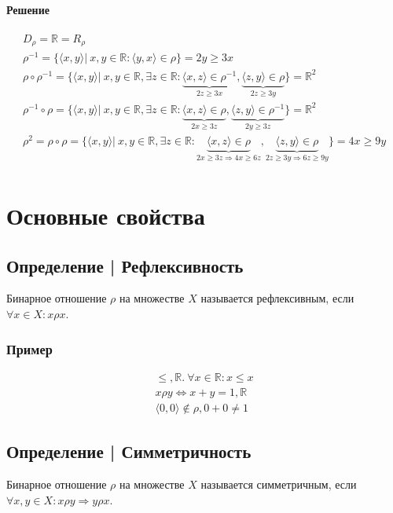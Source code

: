 \documentclass{article}
\begin{document}
\paragraph{Решение}
\begin{gather*}
    D_{\rho} = \mathbb{R} = R_{\rho} \\
    \rho^{-1} = \{\langle x, y \rangle |~x, y \in \mathbb{R}: \langle y, x \rangle \in \rho\} = 2y \ge 3x \\
    \rho \circ \rho^{-1} = 
    \{\langle x, y \rangle |~x, y \in \mathbb{R}, \exists z \in \mathbb{R}: \underbrace{\langle x, z \rangle \in \rho^{-1}}_{2z \ge 3x}, \underbrace{\langle z, y \rangle \in \rho}_{2z \ge 3y}\} = \mathbb{R}^2 \\
    \rho^{-1} \circ \rho = \{\langle x, y \rangle |~x, y \in \mathbb{R}, \exists z \in \mathbb{R}: \underbrace{\langle x, z \rangle \in \rho}_{2x \ge 3z}, \underbrace{\langle z, y \rangle \in \rho^{-1}}_{2y \ge 3z}\} = \mathbb{R}^2 \\
    \rho^2 = \rho \circ \rho = \{\langle x, y \rangle |~x, y \in \mathbb{R}, \exists z \in \mathbb{R}: \underbrace{\langle x, z \rangle \in \rho}_{2x \ge 3z \Rightarrow 4x \ge 6z}, \underbrace{\langle z, y \rangle \in \rho}_{2z \ge 3y \Rightarrow 6z \ge 9y}\} = 4x \ge 9y \\
\end{gather*}


\section{Основные свойства}

\subsection{Определение | Рефлексивность}
Бинарное отношение $\rho$ на множестве $X$ называется рефлексивным, если $\forall x \in X: x \rho x$.

\subsubsection{Пример}
\begin{gather*}
    \le, \mathbb{R}. ~ \forall x \in \mathbb{R}: x \le x \\
    x \rho y \Leftrightarrow x + y = 1, \mathbb{R} \\
    \langle 0, 0 \rangle \notin \rho, 0+0 \neq 1
\end{gather*}


\subsection{Определение | Симметричность}
Бинарное отношение $\rho$ на множестве $X$ называется симметричным, если $\forall x, y \in X: x \rho y \Rightarrow y \rho x$.
\end{document}

